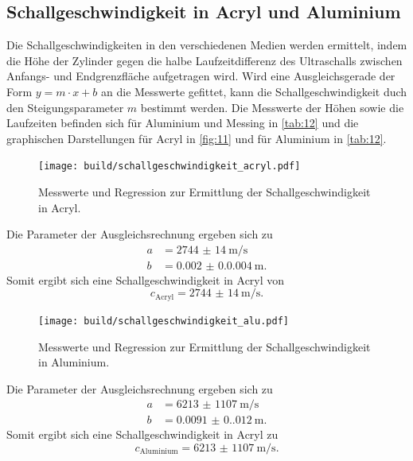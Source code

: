 \subsection{Schallgeschwindigkeit in Acryl und Aluminium}
Die Schallgeschwindigkeiten in den verschiedenen Medien werden ermittelt,
indem die Höhe der Zylinder gegen die halbe Laufzeitdifferenz des Ultraschalls 
zwischen Anfangs- und Endgrenzfläche aufgetragen wird. Wird eine Ausgleichsgerade
der Form $y = m \cdot x + b$ an die Messwerte gefittet, kann die Schallgeschwindigkeit 
duch den Steigungsparameter $m$ bestimmt werden. Die Messwerte der Höhen sowie
die Laufzeiten befinden sich für Aluminium und Messing in \autoref{tab:12} 
und die graphischen Darstellungen für Acryl in \autoref{fig:11} und für Aluminium
in \autoref{tab:12}.
\begin{figure}[H]
    \centering
    \caption{Messwerte und Regression zur Ermittlung der Schallgeschwindigkeit in Acryl.}
    \label{fig:11}
    \texttt{[image: build/schallgeschwindigkeit\_acryl.pdf]}
\end{figure}
\noindent Die Parameter der Ausgleichsrechnung ergeben sich zu 
\begin{align*}
    a &= \qty{2744(14)}{\meter\per\second}\\
    b &= \qty{0.002(0.0004)}{\meter}.
\end{align*}
Somit ergibt sich eine Schallgeschwindigkeit in Acryl von 
\begin{equation}
    c_\text{Acryl} = \qty{2744(14)}{\meter\per\second}.
\end{equation}

\begin{figure}[H]
    \centering
    \caption{Messwerte und Regression zur Ermittlung der Schallgeschwindigkeit in Aluminium.}
    \label{fig:12}
    \texttt{[image: build/schallgeschwindigkeit\_alu.pdf]}
\end{figure}
\noindent Die Parameter der Ausgleichsrechnung ergeben sich zu 
\begin{align*}
    a &= \qty{6213(1107)}{\meter\per\second}\\
    b &= \qty{0.0091(0.012)}{\meter}.
\end{align*}
Somit ergibt sich eine Schallgeschwindigkeit in Acryl zu
\begin{equation}
    c_\text{Aluminium} = \qty{6213(1107)}{\meter\per\second}.
\end{equation}

